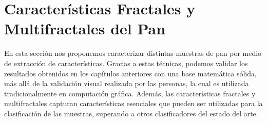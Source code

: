 \documentclass[spanish,a4paper,11pt,oneside,links]{report}
\begin{document}









\chapter{Características Fractales y Multifractales del Pan}
En esta sección nos proponemos caracterizar distintas muestras de pan por medio de extracción de características.
Gracias a estas t\'ecnicas, podemos validar los resultados obtenidos en los cap\'itulos anteriores con una base matem\'atica s\'olida, m\'as all\'a de la validaci\'on visual realizada por las personas, la cual es utilizada tradicionalmente en computaci\'on gr\'afica.
Además, las características fractales y multifractales capturan características esenciales que pueden ser utilizadas para la clasificación de las muestras, superando a otros clasificadores del estado del arte.
\end{document}
